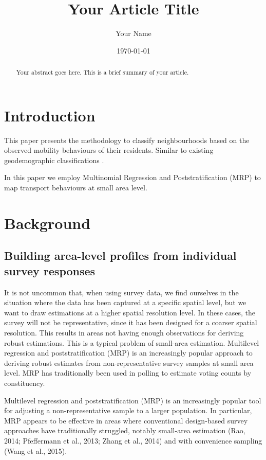 \documentclass[11pt,a4paper]{article}
\title{Your Article Title}
\author{Your Name}
\date{\today}
\begin{document}
\maketitle

\begin{abstract}
Your abstract goes here. This is a brief summary of your article.
\end{abstract}

\section{Introduction}

This paper presents the methodology to classify neighbourhoods based on the observed mobility behaviours of their residents. Similar to existing geodemographic classifications \citep{wyszomierski2024neighbourhood}.

In this paper we employ Multinomial Regression and Poststratification (MRP) to map transport behaviours at small area level.

\section{Background}

\subsection{Building area-level profiles from individual survey responses}

It is not uncommon that, when using survey data, we find ourselves in the situation where the data has been captured at a specific spatial level, but we want to draw estimations at a higher spatial resolution level. In these cases, the survey will not be representative, since it has been designed for a coarser spatial resolution. This results in areas not having enough observations for deriving robust estimations. This is a typical problem of small-area estimation. Multilevel regression and poststratification (MRP) is an increasingly popular approach to deriving robust estimates from non-representative survey samples at small area level. MRP has traditionally been used in polling to estimate voting counts by constituency. 

Multilevel regression and poststratification (MRP) is an increasingly popular tool for adjusting a non-representative sample to a larger population. In particular, MRP appears to be effective in areas where conventional design-based survey approaches have traditionally struggled, notably small-area estimation (Rao, 2014; Pfeffermann et al., 2013; Zhang et al., 2014) and with convenience sampling (Wang et al., 2015).
\end{document}
